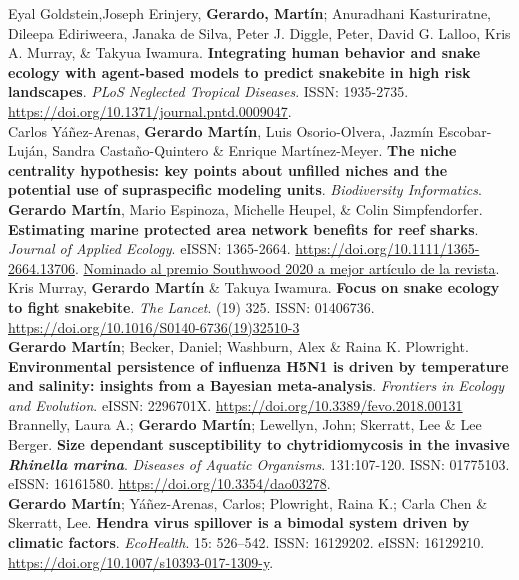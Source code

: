 \documentclass[11pt, letter]{article}
\newcommand{\years}[1]{\marginnote{\scriptsize #1}}
\begin{document}
\years{2021} Eyal Goldstein,Joseph Erinjery, \textbf{Gerardo, Mart\'in}; Anuradhani Kasturiratne, Dileepa Ediriweera, Janaka de Silva, Peter J. Diggle, Peter, David G. Lalloo, Kris A. Murray, \& Takyua Iwamura. \textbf{Integrating human behavior and snake ecology with agent-based models to predict snakebite in high risk landscapes}. \emph{PLoS Neglected Tropical Diseases}. ISSN: 1935-2735. \url{https://doi.org/10.1371/journal.pntd.0009047}.\\

\years{2020} Carlos Y\'a\~nez-Arenas, \textbf{Gerardo Mart\'in}, Luis Osorio-Olvera, Jazm\'in Escobar-Luj\'an, Sandra Casta\~no-Quintero \& Enrique Mart\'inez-Meyer. \textbf{The niche centrality hypothesis: key points about unfilled niches and the potential use of supraspecific modeling units}. \emph{Biodiversity Informatics}.\\

\years{2020} \textbf{Gerardo Mart\'in}, Mario Espinoza, Michelle Heupel, \& Colin Simpfendorfer. \textbf{Estimating marine protected area network benefits for reef sharks}. \emph{Journal of Applied Ecology}. eISSN: 1365-2664. \url{https://doi.org/10.1111/1365-2664.13706}. \href{https://besjournals.onlinelibrary.wiley.com/doi/toc/10.1111/(ISSN)1365-2664.Southwood_Prize_2020}{Nominado al premio Southwood 2020 a mejor artículo de la revista}.\\

\years{2019} Kris Murray, \textbf{Gerardo Mart\'in} \& Takuya Iwamura. \textbf{Focus on snake ecology to fight snakebite}. \emph{The Lancet}. (19) 325. ISSN: 01406736. \url{https://doi.org/10.1016/S0140-6736(19)32510-3}\\

\years{2018} \textbf{Gerardo Mart\'in}; Becker, Daniel; Washburn, Alex \& Raina K. Plowright. \textbf{Environmental persistence of influenza H5N1 is driven by temperature and salinity: insights from a Bayesian meta-analysis}. \emph{Frontiers in Ecology and Evolution}. eISSN: 2296701X. \url{https://doi.org/10.3389/fevo.2018.00131}\\

\years{2018} Brannelly, Laura A.; \textbf{Gerardo Mart\'in}; Lewellyn, John; Skerratt, Lee \& Lee Berger. \textbf{Size dependant susceptibility to chytridiomycosis in the invasive \emph{Rhinella marina}}. \emph{Diseases of Aquatic Organisms}. 131:107-120. ISSN: 01775103. eISSN: 16161580. \url{ https://doi.org/10.3354/dao03278}.\\

\years{2018} \textbf{Gerardo Mart\'in}; Y\'a\~nez-Arenas, Carlos; Plowright, Raina K.; Carla Chen \& Skerratt, Lee. \textbf{Hendra virus spillover is a bimodal system driven by climatic factors}. \emph{EcoHealth}. 15: 526–542. ISSN: 16129202. eISSN: 16129210. \url{https://doi.org/10.1007/s10393-017-1309-y}.\\
\end{document}
